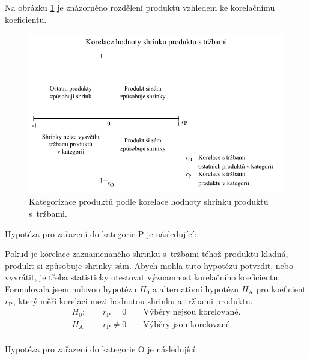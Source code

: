 Na obrázku \ref*{obr:ctg:g:kategorizace1} je znázorněno rozdělení produktů vzhledem ke korelačnímu koeficientu. 

\begin{figure}[hbtp!]
    \centering
    \captionsetup{justification=centering}
    \includegraphics[width=\textwidth]{obrazky/grafy/matice_korelace_typy_DP-graf.pdf}
    \caption{Kategorizace produktů podle korelace hodnoty shrinku produktu s~tržbami.}
    \label{obr:ctg:g:kategorizace1}
\end{figure}

Hypotéza pro zařazení do kategorie P je následující:

Pokud je korelace zaznamenaného shrinku s~tržbami téhož produktu kladná, produkt si způsobuje shrinky sám.
Abych mohla tuto hypotézu potvrdit, nebo vyvrátit, je třeba statisticky otestovat významnost korelačního koeficientu. Formulovala jsem nulovou hypotézu $H_\mathrm{0}$ a alternativní hypotézu $H_\mathrm{A}$ pro koeficient $r_\mathrm{P}$, který měří korelaci mezi hodnotou shrinku a tržbami produktu.
\begin{equation*}
    \begin{aligned}
        H_\mathrm{0}: \quad & r_\mathrm{P} = 0 \qquad \mbox{Výběry nejsou korelované.}  \\
        H_\mathrm{A}: \quad & r_\mathrm{P} \neq 0 \qquad\mbox{Výběry jsou korelované.}\\
    \end{aligned}
\end{equation*}

Hypotéza pro zařazení do kategorie O je následující:

